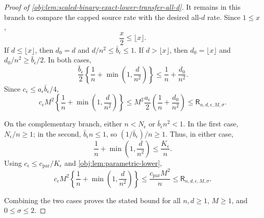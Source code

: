 \begin{proof}[Proof of \cref{obj:lem:scaled-binary-exact-lower-transfer-all-d}]
It remains in this branch to compare the capped source rate with the desired all-\(d\) rate.  Since \(1\le x\),
\[
\frac{x}{2}\le \lfloor x\rfloor .
\] %
If \(d\le\lfloor x\rfloor\), then \(d_0=d\) and \(d/n^2\le \bar b_\epsilon\le1\).  If \(d>\lfloor x\rfloor\), then
\(d_0=\lfloor x\rfloor\) and \(d_0/n^2\ge \bar b_\epsilon/2\).  In both cases,
\[
\frac{\bar b_\epsilon}{2}
\left\{\frac1n+\min\left(1,\frac d{n^2}\right)\right\}
\le
\frac1n+\frac{d_0}{n^2}.
\] %
Since \(c_\epsilon\le a_\epsilon \bar b_\epsilon/4\),
\[
c_\epsilon M^2
\left\{\frac1n+\min\left(1,\frac d{n^2}\right)\right\}
\le
M^2\frac{a_\epsilon}{2}
\left(\frac1n+\frac{d_0}{n^2}\right)
\le
\mathsf R_{n,d,\epsilon,M,\sigma}.
\] %

On the complementary branch, either \(n<N_\epsilon\) or \(\bar b_\epsilon n^2<1\).  In the first case, \(N_\epsilon/n\ge1\); in the second, \(\bar b_\epsilon n\le1\), so \((1/\bar b_\epsilon)/n\ge1\).  Thus, in either case,
\[
\frac1n+\min\left(1,\frac d{n^2}\right)
\le
\frac{K_\epsilon}{n}.
\] %
Using \(c_\epsilon\le c_{\mathrm{par}}/K_\epsilon\) and
\cref{obj:lem:parametric-lower},
\[
c_\epsilon M^2
\left\{\frac1n+\min\left(1,\frac d{n^2}\right)\right\}
\le
\frac{c_{\mathrm{par}}M^2}{n}
\le
\mathsf R_{n,d,\epsilon,M,\sigma}.
\] %

Combining the two cases proves the stated bound for all \(n,d\ge1\), \(M\ge1\), and \(0\le\sigma\le2\). %
\end{proof}
